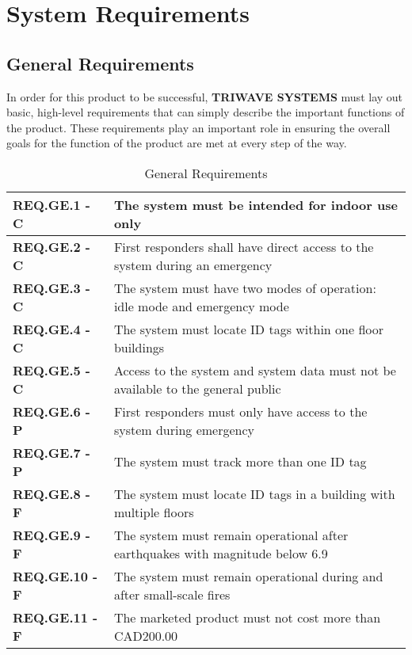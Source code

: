 \documentclass[11pt]{article}
\begin{document}
\setcounter{section}{2}
\section{System Requirements}



\break
\subsection{General Requirements}
In order for this product to be successful, \textbf{TRIWAVE SYSTEMS} must lay out basic, high-level requirements that can simply describe the important functions of the product. These requirements play an important role in ensuring the overall goals for the function of the product are met at every step of the way.

\bgroup
\def\arraystretch{1.5}
\begin{table}[H]
\centering
\begin{tabular}{ | m{3.5cm} | m{12.5cm} | } 
 \hline
 \textbf{ REQ.GE.1 - C } & The system must be intended for indoor use only \\ 
\hline
 \textbf{ REQ.GE.2 - C } & First responders shall have direct access to the system during an emergency \\ 
\hline
 \textbf{ REQ.GE.3 - C } & The system must have two modes of operation: idle mode and emergency mode \\ 
\hline
 \textbf{ REQ.GE.4 - C } & The system must locate ID tags within one floor buildings \\
\hline
 \textbf{ REQ.GE.5 - C } & Access to the system and system data must not be available to the general public \\
\hline
 \textbf{ REQ.GE.6 - P } & First responders must only have access to the system during emergency \\
\hline
 \textbf{ REQ.GE.7 - P } & The system must track more than one ID tag \\
\hline
 \textbf{ REQ.GE.8 - F } & The system must locate ID tags in a building with multiple floors \\
\hline
 \textbf{ REQ.GE.9 - F } & The system must remain operational after earthquakes with magnitude below 6.9 \\
\hline
 \textbf{ REQ.GE.10 - F } & The system must remain operational during and after small-scale fires \\
\hline
 \textbf{ REQ.GE.11 - F } & The marketed product must not cost more than CAD200.00 \\
\hline
\end{tabular}
\caption{General Requirements}
\end{table}	
\end{document}
